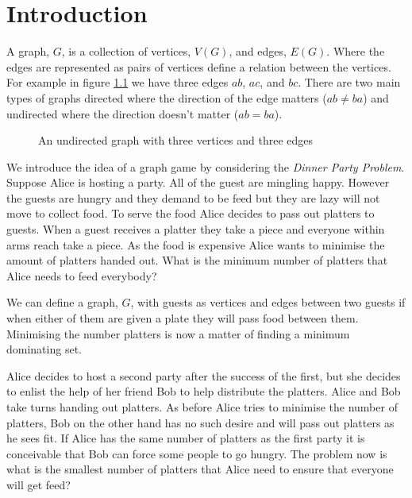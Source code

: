 \chapter{Introduction}\label{chpt:into}
A graph, $G$, is a collection of vertices, $V(G)$, and edges, $E(G)$. Where the edges are represented as pairs of vertices define a relation between the vertices. For example in figure \ref{fig:k3} we have three edges $ab$, $ac$, and $bc$. There are two main types of graphs directed where the direction of the edge matters ($ab\neq ba$) and undirected where the direction doesn't matter ($ab=ba$).

\begin{figure}[h]
    \centering
{}
    \caption{An undirected graph with three vertices and three edges}
\label{fig:k3}
\end{figure}
   
We introduce the idea of a graph game by considering the \textit{Dinner Party Problem}.
Suppose Alice is hosting a party. All of the guest are mingling happy. However the guests are hungry and they demand to be feed but they are lazy will not move to collect food. To serve the food Alice decides to pass out platters to guests. When a guest receives a platter they take a piece and everyone within arms reach take a piece. As the food is expensive Alice wants to minimise the amount of platters handed out. What is the minimum number of platters that Alice needs to feed everybody? 

We can define a graph, $G$, with guests as vertices and edges between two guests if when either of them are given a plate they will pass food between them. Minimising the number platters is now a matter of finding a minimum dominating set.

Alice decides to host a second party after the success of the first, but she decides to enlist the help of her friend Bob to help distribute the platters. Alice and Bob take turns handing out platters. As before Alice tries to minimise the number of platters, Bob on the other hand has no such desire and will pass out platters as he sees fit. If Alice has the same number of platters as the first party it is conceivable that Bob can force some people to go hungry. The problem now is what is the smallest number of platters that Alice need to ensure that everyone will get feed? 

